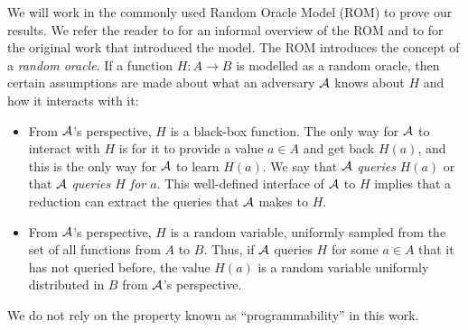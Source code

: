 We will work in the commonly used Random Oracle Model (ROM) to prove our results. We refer the reader to \cite[Chapter 6.5]{introduction-to-modern-cryptography} for an informal overview of the ROM and to \cite{rom} for the original work that introduced the model. The ROM introduces the concept of a \emph{random oracle}. If a function $H : A \to B$ is modelled as a random oracle, then certain assumptions are made about what an adversary $\mathcal{A}$ knows about $H$ and how it interacts with it:
\begin{itemize}
	\item From $\mathcal{A}$'s perspective, $H$ is a black-box function. The only way for $\mathcal{A}$ to interact with $H$ is for it to provide a value $a \in A$ and get back $H(a)$, and this is the only way for $\mathcal{A}$ to learn $H(a)$. We say that $\mathcal{A}$ \emph{queries} $H(a)$ or that $\mathcal{A}$ \emph{queries $H$ for $a$}. This well-defined interface of $\mathcal{A}$ to $H$ implies that a reduction can extract the queries that $\mathcal{A}$ makes to $H$.
	\item From $\mathcal{A}$'s perspective, $H$ is a random variable, uniformly sampled from the set of all functions from $A$ to $B$. Thus, if $\mathcal{A}$ queries $H$ for some $a \in A$ that it has not queried before, the value $H(a)$ is a random variable uniformly distributed in $B$ from $\mathcal{A}$'s perspective.
\end{itemize}
We do not rely on the property known as ``programmability'' in this work.
